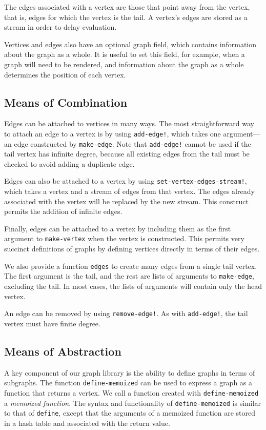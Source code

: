 \documentclass[11pt]{article} %
\theoremstyle{component}
\begin{document}
The edges associated with a vertex are those that point away from the vertex, that is, edges for which the vertex is the tail.  A vertex's edges are stored as a stream in order to delay evaluation.

Vertices and edges also have an optional graph field, which contains information about the graph as a whole.  It is useful to set this field, for example, when a graph will need to be rendered, and information about the graph as a whole determines the position of each vertex.

\subsection{Means of Combination}

Edges can be attached to vertices in many ways.  The most straightforward way to attach an edge to a vertex is by using \verb|add-edge!|, which takes one argument---an edge constructed by \verb|make-edge|.  Note that \verb|add-edge!| cannot be used if the tail vertex has infinite degree, because all existing edges from the tail must be checked to avoid adding a duplicate edge.

Edges can also be attached to a vertex by using \verb|set-vertex-edges-stream!|, which takes a vertex and a stream of edges from that vertex.  The edges already associated with the vertex will be replaced by the new stream.  This construct permits the addition of infinite edges.

Finally, edges can be attached to a vertex by including them as the first argument to \verb|make-vertex| when the vertex is constructed.  This permits very succinct definitions of graphs by defining vertices directly in terms of their edges.

We also provide a function \verb|edges| to create many edges from a single tail vertex.  The first argument is the tail, and the rest are lists of arguments to \verb|make-edge|, excluding the tail.  In most cases, the lists of arguments will contain only the head vertex.

An edge can be removed by using \verb|remove-edge!|.  As with \verb|add-edge!|, the tail vertex must have finite degree.

\subsection{Means of Abstraction}

A key component of our graph library is the ability to define graphs in terms of subgraphs.  The function \verb|define-memoized| can be used to express a graph as a function that returns a vertex.  We call a function created with \verb|define-memoized| a \emph{memoized function}.  The syntax and functionality of \verb|define-memoized| is similar to that of \verb|define|, except that the arguments of a memoized function are stored in a hash table and associated with the return value.
\end{document}
